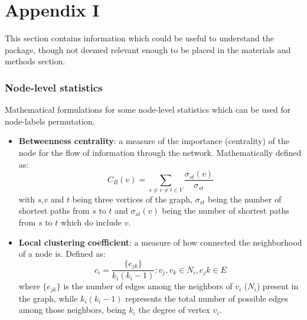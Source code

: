 \graphicspath{{chapters/90_appendix_i/images}}
\chapter*{Appendix I}

This section contains information which could be useful to understand the package, though not deemed relevant enough to be placed in the materials and methods section. 

\subsection*{Node-level statistics}
Mathematical formulations for some node-level statistics which can be used for node-labels permutation.

\begin{itemize}\tightlist
  \item \textbf{Betweenness centrality}: a measure of the importance (centrality) of the node for the flow of information through the network. Mathematically defined as:
  $$C_B(v) = \sum_{s \neq v \neq t \in V} \frac{\sigma_{st}(v)}{\sigma_{st}}$$
  with $s$,$v$ and $t$ being three vertices of the graph, $\sigma_{st}$ being the number of shortest paths from $s$ to $t$ and $\sigma_{st}(v)$ being the number of shortest paths from $s$ to $t$ which do include $v$.
  \item \textbf{Local clustering coefficient}: a measure of how connected the neighborhood of a node is. Defined as:
  $$c_i = \frac{\{e_{jk}\}}{k_i(k_i-1)} : v_j,v_k \in N_i, e_jk \in E$$
  where $\{e_{jk}\}$ is the number of edges among the neighbors of $v_i$ ($N_i$) present in the graph, while $k_i(k_i-1)$ represents the total number of possible edges among those neighbors, being $k_i$ the degree of vertex $v_i$.
\end{itemize}